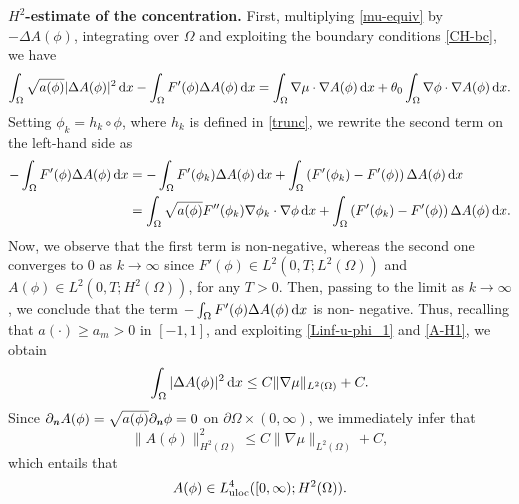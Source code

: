 \documentclass[11pt,reqno]{amsart}
\theoremstyle{remark}
\def\n{\textbf{\textit{n}}}
\def\d{{\rm d}}
\numberwithin{equation}{section}
\def\d{{\rm d}}
\begin{document}
\textbf{$H^2$-estimate of the concentration.} First, multiplying \eqref{mu-equiv} by $-\Delta A(\phi)$, integrating over $\Omega$ and exploiting the boundary conditions \eqref{CH-bc}, we have
\begin{align*}
\int_\Omega \sqrt{a(\phi)} |\Delta A(\phi)|^2 \, \d x
- \int_\Omega  F'(\phi) \Delta A(\phi) \, \d x
= \int_\Omega \nabla \mu \cdot \nabla A(\phi) \, \d x
+ \theta_0 \int_\Omega \nabla \phi \cdot \nabla A(\phi) \, \d x.
\end{align*}
Setting $\phi_k = h_k \circ \phi$, where $h_k$ is defined in \eqref{trunc}, we rewrite the second term on the left-hand side as
\begin{align*}
- \int_\Omega  F'(\phi) \Delta A(\phi) \, \d x
&= - \int_\Omega  F'(\phi_k) \Delta A(\phi) \, \d x
+ \int_\Omega  \left( F'(\phi_k) - F'(\phi) \right) \Delta A(\phi) \, \d x
\\
&= \int_\Omega  \sqrt{a(\phi)} F''(\phi_k) \nabla \phi_k \cdot \nabla \phi  \, \d x
+ \int_\Omega  \left( F'(\phi_k) - F'(\phi) \right) \Delta A(\phi) \, \d x.
\end{align*}
Now, we observe that the first term is non-negative, whereas the second one converges to $0$ as $k \to \infty$ since $F'(\phi) \in L^2(0,T; L^2(\Omega))$ and $A(\phi) \in L^2(0,T;H^2(\Omega))$, for any $T>0$. Then, passing to the limit as $k \to \infty$, we conclude that the term $- \int_\Omega  F'(\phi) \Delta A(\phi) \, \d x$ is non- negative. Thus, recalling that $a(\cdot) \geq a_m>0$ in $[-1,1]$, and exploiting \eqref{Linf-u-phi_1} and \eqref{A-H1}, we obtain
\begin{equation*}
\int_\Omega  |\Delta A(\phi)|^2 \, \d x \leq C \| \nabla \mu\|_{L^2(\Omega)} + C.
\end{equation*}
Since $\partial_\n A(\phi)= \sqrt{a(\phi)} \partial_\n \phi=0$ on $\partial \Omega \times (0,\infty)$, we immediately infer that
\begin{equation}
\label{est-A-H2}
\| A(\phi)\|_{H^2(\Omega)}^2 \leq C \| \nabla \mu\|_{L^2(\Omega)} + C,
\end{equation}
which entails that
\begin{equation}
\label{bound-A-H2}
A(\phi) \in L_{\rm uloc}^4([0,\infty); H^2(\Omega)).
\end{equation}
\end{document}
